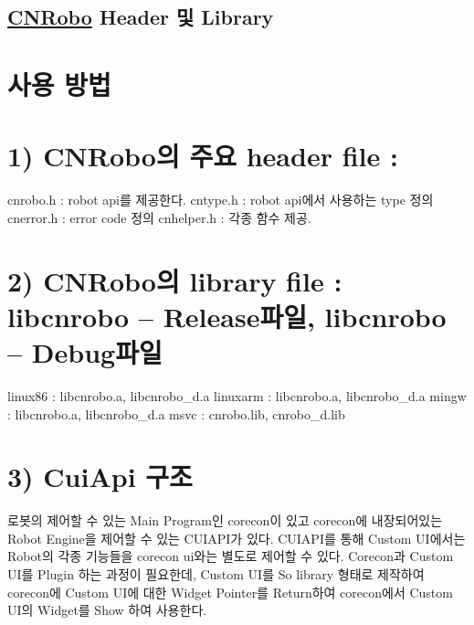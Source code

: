 \subsection*{\hyperlink{classCNRobo}{C\-N\-Robo} Header 및 Library}

\section*{사용 방법}

\section*{1) C\-N\-Robo의 주요 header file \-:}

\begin{DoxyVerb}    cnrobo.h : robot api를 제공한다.
    cntype.h : robot api에서 사용하는 type 정의 
    cnerror.h : error code 정의
    cnhelper.h : 각종 함수 제공.
\end{DoxyVerb}


\section*{2) C\-N\-Robo의 library file \-: libcnrobo – Release파일, libcnrobo – Debug파일}

\begin{DoxyVerb}    linux86 : libcnrobo.a, libcnrobo_d.a
    linuxarm : libcnrobo.a, libcnrobo_d.a
    mingw : libcnrobo.a, libcnrobo_d.a
    msvc : cnrobo.lib, cnrobo_d.lib
\end{DoxyVerb}


\section*{3) Cui\-Api 구조}

\begin{DoxyVerb}    로봇의 제어할 수 있는 Main Program인 corecon이 있고 corecon에 내장되어있는
    Robot Engine을 제어할 수 있는 CUIAPI가 있다. CUIAPI를 통해 Custom UI에서는 
    Robot의 각종 기능들을 corecon ui와는 별도로 제어할 수 있다.
    Corecon과 Custom UI를 Plugin 하는 과정이 필요한데, Custom UI를 
    So library 형태로 제작하여 corecon에 Custom UI에 대한 Widget Pointer를 Return하여 
    corecon에서 Custom UI의 Widget를 Show 하여 사용한다.\end{DoxyVerb}
 